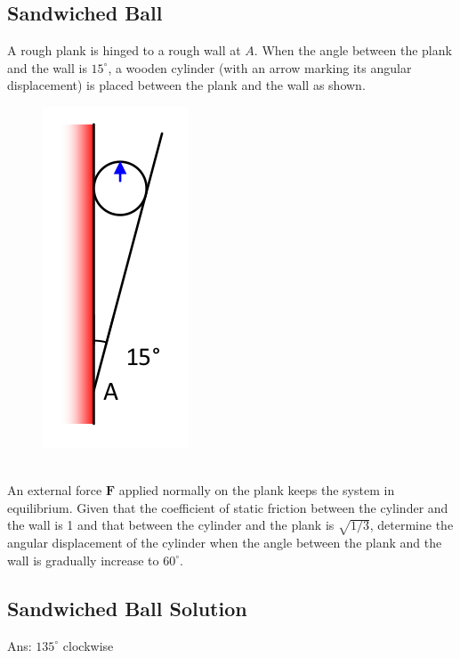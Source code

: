 \documentclass{article}
\begin{document}
\subsection{Sandwiched Ball }
A rough plank is hinged to a rough wall at $A$.
When the angle between the plank and the wall is $15^{\circ}$, a wooden cylinder (with an arrow marking its angular displacement) is placed between the plank and the wall as shown.
\begin{figure}[h]
    \centering
\includegraphics[width=0.5\linewidth]{images/sandwichedball.png}
\end{figure}\\
An external force $\mathbf{F}$ applied normally on the plank keeps the system in equilibrium.
Given that the coefficient of static friction between the cylinder and the wall is 1 and that between the cylinder and the plank is $\sqrt{1 / 3}$, determine the angular displacement of the cylinder when the angle between the plank and the wall is gradually increase to $60^{\circ}$.
\clearpage
\subsection{Sandwiched Ball Solution}
Ans: $135^{\circ}$ clockwise
\clearpage
\end{document}
